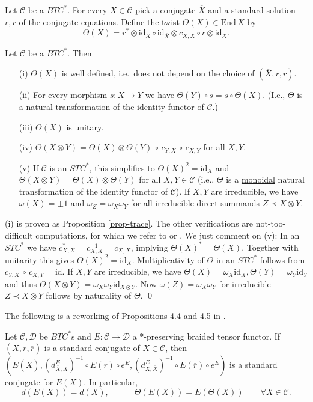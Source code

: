 \documentclass[11pt]{article}
\theoremstyle{definition}
\theoremstyle{definition}
\theoremstyle{remark}
\def\2#1{{\mathcal #1}}
\def\ol#1{{\overline #1}}
\newcommand{\End}{\mathrm{End}}
\newcommand{\mcirc}{\,\circ\,}
\newcommand{\rarr}{\rightarrow}
\def\id{\mathrm{id}}
\begin{document}
\bdefin \label{def-twist} 
Let $\2C$ be a $BTC^*$. For every $X\in\2C$ pick a conjugate $\ol{X}$ and a standard solution
$r, \ol{r}$ of the conjugate equations. Define the twist $\Theta(X)\in\End\,X$ by
\[ \Theta(X)=r^*\otimes\id_X\circ\id_{\ol{X}}\otimes c_{X,X}\circ r\otimes\id_X. \]
\edefin

\blemma \label{lem-twist}
Let $\2C$ be a $BTC^*$. Then
\begin{enumerate}
\item[(i)] $\Theta(X)$ is well defined, i.e.\ does not depend on the choice of $(\ol{X},r,\ol{r})$. 
\item[(ii)] For every morphism $s: X\rarr Y$ we have $\Theta(Y)\circ s=s\circ\Theta(X)$. (I.e.,
$\Theta$ is a natural transformation of the identity functor of $\2C$.) 
\item[(iii)] $\Theta(X)$ is unitary.
\item[(iv)] $\Theta(X\otimes Y)=\Theta(X)\otimes\Theta(Y)\mcirc c_{Y,X}\mcirc c_{X,Y}$ for all
$X,Y$. 
\item[(v)] If $\2C$ is an $STC^*$, this simplifies to $\Theta(X)^2=\id_X$ and
$\Theta(X\otimes Y)=\Theta(X)\otimes\Theta(Y)$ for all $X,Y\in\2C$ (i.e., $\Theta$ is a
\underline{monoidal} natural transformation of the identity functor of $\2C$). If $X,Y$ are
irreducible, we have $\omega(X)=\pm 1$ and $\omega_Z=\omega_X\omega_Y$ for all irreducible direct
summands $Z\prec X\otimes Y$. 
\end{enumerate}
\elemma

\prf (i) is proven as Proposition \ref{prop-trace}. The other verifications are not-too-difficult
computations, for which we refer to \cite{LR} or \cite{mue06}. We just comment on (v): In an $STC^*$
we have $c_{X,X}^*=c_{X,X}^{-1}=c_{X,X}$, implying $\Theta(X)^*=\Theta(X)$. Together with unitarity
this gives $\Theta(X)^2=\id_X$. Multiplicativity of $\Theta$ in an $STC^*$ follows from 
$c_{Y,X}\mcirc c_{X,Y}=\id$. If $X,Y$ are irreducible, we have
$\Theta(X)=\omega_X\id_X, \Theta(Y)=\omega_Y\id_Y$ and thus 
$\Theta(X\otimes Y)=\omega_X\omega_Y\id_{X\otimes Y}$. Now $\omega(Z)=\omega_X\omega_Y$ for
irreducible $Z\prec X\otimes Y$ follows by naturality of $\Theta$.
\qed

The following is a reworking of Propositions 4.4 and 4.5 in \cite{LR}.

\bprop \label{prop-stand2}
Let $\2C,\2D$ be  $BTC^*$s and $E:\2C\rarr\2D$ a $*$-preserving braided tensor functor. If
$(\ol{X},r,\ol{r})$ is a standard conjugate of $X\in\2C$, then 
$(E(\ol{X}),(d^E_{\ol{X},X})^{-1}\circ E(r)\circ e^E,(d^E_{X,\ol{X}})^{-1}\circ E(\ol{r})\circ e^E)$ is a
standard conjugate for $E(X)$. In particular, 
\[ d(E(X))=d(X), \quad\quad\quad \Theta(E(X))=E(\Theta(X)) \quad\quad\forall X\in\2C. \]
\eprop
\end{document}
